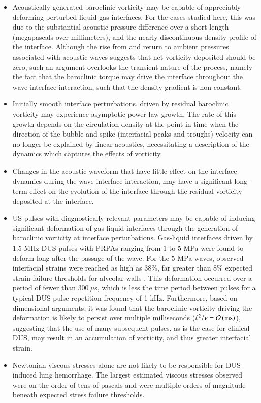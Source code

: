 \begin{itemize}
\item Acoustically generated baroclinic vorticity may be capable of
  appreciably deforming perturbed liquid-gas interfaces. For the cases
  studied here, this was due to the substantial acoustic pressure
  difference over a short length (megapascals over millimeters), and
  the nearly discontinuous density profile of the interface. Although
  the rise from and return to ambient pressures associated with
  acoustic waves suggests that net vorticity deposited should be zero,
  such an argument overlooks the transient nature of the process,
  namely the fact that the baroclinic torque may drive the interface
  throughout the wave-interface interaction, such that the density
  gradient is non-constant.
\item Initially smooth interface perturbations, driven by residual
  baroclinic vorticity may experience asymptotic power-law growth. The
  rate of this growth depends on the circulation density at the point
  in time when the direction of the bubble and spike (interfacial
  peaks and troughs) velocity can no longer be explained by linear
  acoustics, necessitating a description of the dynamics which
  captures the effects of vorticity.
\item Changes in the acoustic waveform that have little effect on the
  interface dynamics during the wave-interface interaction, may have a
  significant long-term effect on the evolution of the interface
  through the residual vorticity deposited at the interface.
\item \ac{US} pulses with diagnostically relevant parameters may be
  capable of inducing significant deformation of gas-liquid interfaces
  through the generation of baroclinic vorticity at interface
  perturbations. Gas-liquid interfaces driven by $1.5$ MHz \ac{DUS}
  pulses with \ac{PRPA}s ranging from $1$ to $5$ MPa were found to
  deform long after the passage of the wave. For the $5$ MPa waves,
  observed interfacial strains were reached as high as 38\%, far
  greater than 8\% expected strain failure thresholds for alveolar
  walls \cite{Belete2010}. This deformation occurred over a period of
  fewer than $300~\mu$s, which is less the time period between pulses
  for a typical \ac{DUS} pulse repetition frequency of 1 kHz.
  Furthermore, based on dimensional arguments, it was found that the
  baroclinic vorticity driving the deformation is likely to persist
  over multiple milliseconds ($\ell^2/\nu=\mathcal{O}\left(\mbox{ms}\right)$),
  suggesting that the use of many subsequent pulses, as is the case
  for clinical \ac{DUS}, may result in an accumulation of vorticity,
  and thus greater interfacial strain.
\item Newtonian viscous stresses alone are not likely to be
  responsible for \ac{DUS}-induced lung hemorrhage. The largest
  estimated viscous stresses observed were on the order of tens of
  pascals and were multiple orders of magnitude beneath expected
  stress failure thresholds.
\end{itemize}

